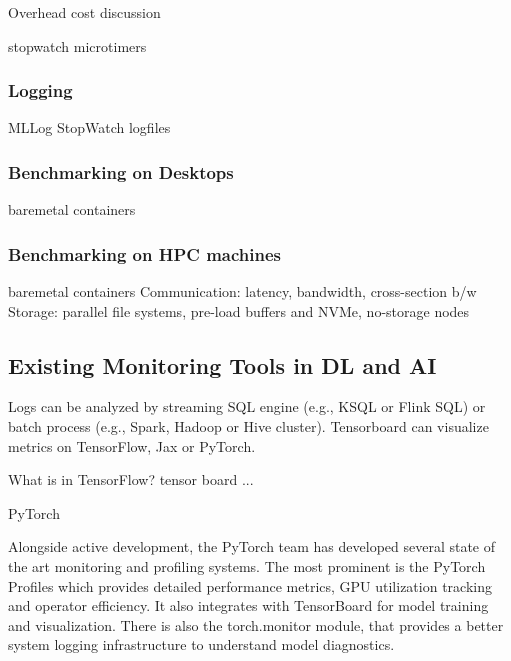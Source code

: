 Overhead cost discussion

    stopwatch 
    microtimers

\subsubsection{Logging}
\label{subsubsec:benchmarks-mlcommons-logging}


MLLog
StopWatch
logfiles

\subsubsection{Benchmarking on Desktops}
\label{subsubsec:benchmarks-mlcommons-desktop}


baremetal
containers

\subsubsection{Benchmarking on HPC machines}
\label{subsubsec:benchmarks-mlcommons-hpc}


baremetal
containers
Communication: latency, bandwidth, cross-section b/w
Storage: parallel file systems, pre-load buffers and NVMe, no-storage nodes

\subsection{Existing Monitoring Tools in DL and AI}
\label{subsec:benchmarks-monitor}

Logs can be analyzed by streaming SQL engine (e.g., KSQL or Flink SQL) or batch process (e.g., Spark, Hadoop or Hive cluster).
Tensorboard can visualize metrics on TensorFlow, Jax or PyTorch.

What is in TensorFlow? tensor board ...

PyTorch

Alongside active development, the PyTorch team has developed several state of the art monitoring and profiling systems.
The most prominent is the PyTorch Profiles which provides detailed performance metrics, GPU utilization tracking and operator efficiency. It also integrates with TensorBoard for model training and visualization.
There is also the torch.monitor module, that provides a better system logging infrastructure to understand model diagnostics.

